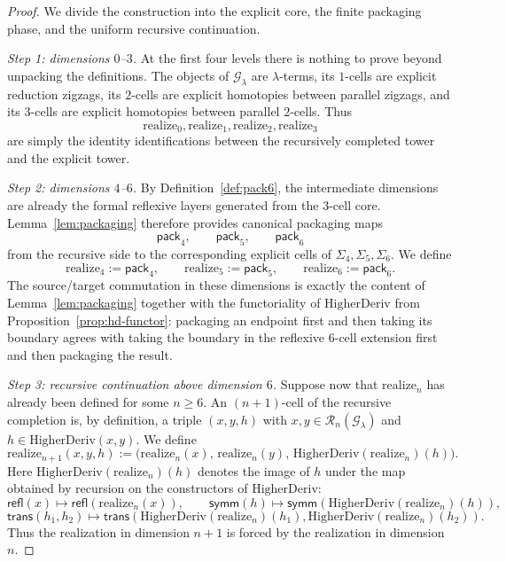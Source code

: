 \documentclass[webpdf,traditional,large,numbered]{oup-authoring-template}
\theoremstyle{thmstyleone}%
\theoremstyle{thmstyletwo}%
\theoremstyle{thmstylethree}%
\newcommand{\HigherDeriv}{\mathrm{HigherDeriv}}
\newcommand{\realize}{\mathrm{realize}}
\begin{document}
\begin{proof}
We divide the construction into the explicit core, the finite packaging phase,
and the uniform recursive continuation.

\smallskip
\noindent
\emph{Step 1: dimensions $0$--$3$.}
At the first four levels there is nothing to prove beyond unpacking the
definitions.  The objects of $\mathscr{G}_\lambda$ are $\lambda$-terms, its
$1$-cells are explicit reduction zigzags, its $2$-cells are explicit
homotopies between parallel zigzags, and its $3$-cells are explicit homotopies
between parallel $2$-cells.  Thus
\[
\realize_0,\realize_1,\realize_2,\realize_3
\]
are simply the identity identifications between the recursively completed tower
and the explicit tower.

\smallskip
\noindent
\emph{Step 2: dimensions $4$--$6$.}
By Definition~\ref{def:pack6}, the intermediate dimensions are already the
formal reflexive layers generated from the $3$-cell core.
Lemma~\ref{lem:packaging} therefore provides canonical packaging maps
\[
\mathsf{pack}_4,\qquad \mathsf{pack}_5,\qquad \mathsf{pack}_6
\]
from the recursive side to the corresponding explicit cells of
$\Sigma_4,\Sigma_5,\Sigma_6$.  We define
\[
\realize_4:=\mathsf{pack}_4,\qquad
\realize_5:=\mathsf{pack}_5,\qquad
\realize_6:=\mathsf{pack}_6.
\]
The source/target commutation in these dimensions is exactly the content of
Lemma~\ref{lem:packaging} together with the functoriality of $\HigherDeriv$ from
Proposition~\ref{prop:hd-functor}: packaging an endpoint first and then taking
its boundary agrees with taking the boundary in the reflexive $6$-cell
extension first and then packaging the result.

\smallskip
\noindent
\emph{Step 3: recursive continuation above dimension $6$.}
Suppose now that $\realize_n$ has already been defined for some $n\ge 6$.
An $(n+1)$-cell of the recursive completion is, by definition, a triple
$(x,y,h)$ with $x,y\in \mathscr{R}_n(\mathscr{G}_\lambda)$ and
$h\in \HigherDeriv(x,y)$.  We define
\[
\realize_{n+1}(x,y,h)
:=
\bigl(\realize_n(x),\,\realize_n(y),\,
\HigherDeriv(\realize_n)(h)\bigr).
\]
Here $\HigherDeriv(\realize_n)(h)$ denotes the image of $h$ under the map
obtained by recursion on the constructors of $\HigherDeriv$:
\[
\mathsf{refl}(x)\mapsto \mathsf{refl}(\realize_n(x)),\qquad
\mathsf{symm}(h)\mapsto \mathsf{symm}(\HigherDeriv(\realize_n)(h)),
\]
\[
\mathsf{trans}(h_1,h_2)\mapsto
\mathsf{trans}(\HigherDeriv(\realize_n)(h_1),
               \HigherDeriv(\realize_n)(h_2)).
\]
Thus the realization in dimension $n+1$ is forced by the realization in
dimension $n$.


\end{proof}
\end{document}
